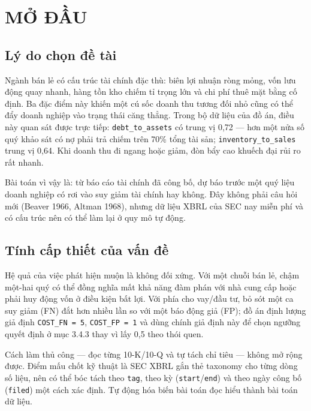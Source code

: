 \documentclass[13pt,a4paper]{extreport}
\begin{document}

\listoftables

\clearpage


\listoffigures

\clearpage

\chapter{MỞ ĐẦU}

\section{Lý do chọn đề tài}

Ngành bán lẻ có cấu trúc tài chính đặc thù: biên lợi nhuận ròng mỏng, vốn lưu động quay nhanh, hàng tồn kho chiếm tỉ trọng lớn và chi phí thuê mặt bằng cố định. Ba đặc điểm này khiến một cú sốc doanh thu tương đối nhỏ cũng có thể đẩy doanh nghiệp vào trạng thái căng thẳng. Trong bộ dữ liệu của đồ án, điều này quan sát được trực tiếp: \texttt{debt\_to\_assets} có trung vị 0,72 — hơn một nửa số quý khảo sát có nợ phải trả chiếm trên 70\% tổng tài sản; \texttt{inventory\_to\_sales} trung vị 0,64. Khi doanh thu đi ngang hoặc giảm, đòn bẩy cao khuếch đại rủi ro rất nhanh.

Bài toán vì vậy là: từ báo cáo tài chính đã công bố, dự báo trước một quý liệu doanh nghiệp có rơi vào suy giảm tài chính hay không. Đây không phải câu hỏi mới (Beaver 1966, Altman 1968), nhưng dữ liệu XBRL của SEC nay miễn phí và có cấu trúc nên có thể làm lại ở quy mô tự động.

\section{Tính cấp thiết của vấn đề}

Hệ quả của việc phát hiện muộn là không đối xứng. Với một chuỗi bán lẻ, chậm một-hai quý có thể đồng nghĩa mất khả năng đàm phán với nhà cung cấp hoặc phải huy động vốn ở điều kiện bất lợi. Với phía cho vay/đầu tư, bỏ sót một ca suy giảm (FN) đắt hơn nhiều lần so với một báo động giả (FP); đồ án định lượng giả định \texttt{COST\_FN = 5}, \texttt{COST\_FP = 1} và dùng chính giả định này để chọn ngưỡng quyết định ở mục 3.4.3 thay vì lấy 0,5 theo thói quen.

Cách làm thủ công — đọc từng 10-K/10-Q và tự tách chỉ tiêu — không mở rộng được. Điểm mấu chốt kỹ thuật là SEC XBRL gắn thẻ taxonomy cho từng dòng số liệu, nên có thể bóc tách theo \texttt{tag}, theo kỳ (\texttt{start}/\texttt{end}) và theo ngày công bố (\texttt{filed}) một cách xác định. Tự động hóa biến bài toán đọc hiểu thành bài toán dữ liệu.
\end{document}
